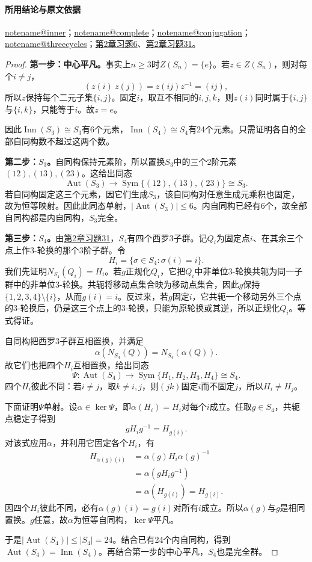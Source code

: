 \documentclass[UTF8,a4paper,11pt,fontset=windows]{ctexart}
\makeatletter
\DeclareMathOperator{\Aut}{Aut}\DeclareMathOperator{\Inn}{Inn}
\newcommand{\noteref}[1]{\hyperref[note:#1]{\csname notename@#1\endcsname}}
\newcommand{\exref}[2]{\hyperref[ex:#1:#2]{第#1章习题#2}}
\makeatother
\begin{document}
\paragraph{所用结论与原文依据}
\noteref{inner}；\noteref{complete}；\noteref{conjugation}；\noteref{threecycles}；\exref{2}{6}、\exref{2}{31}。


\begin{proof}
\textbf{第一步：中心平凡。}事实上$n\ge3$时$Z(S_n)=\{e\}$。若$z\in Z(S_n)$，则对每个$i\ne j$，
\[
(z(i)\ z(j))=z(ij)z^{-1}=(ij),
\]
所以$z$保持每个二元子集$\{i,j\}$。固定$i$，取互不相同的$i,j,k$，则$z(i)$同时属于$\{i,j\}$与$\{i,k\}$，只能等于$i$。故$z=e$。

因此$\operatorname{Inn}(S_3)\cong S_3$有6个元素，$\operatorname{Inn}(S_4)\cong S_4$有24个元素。只需证明各自的全部自同构数不超过这两个数。

\textbf{第二步：$S_3$。}自同构保持元素阶，所以置换$S_3$中的三个2阶元素$(12),(13),(23)$。这给出同态
\[
\Aut(S_3)\longrightarrow\operatorname{Sym}\{(12),(13),(23)\}\cong S_3.
\]
若自同构固定这三个元素，因它们生成$S_3$，该自同构对任意生成元乘积也固定，故为恒等映射。因此此同态单射，$|\Aut(S_3)|\le6$。内自同构已经有6个，故全部自同构都是内自同构，$S_3$完全。

\textbf{第三步：$S_4$。}由\exref{2}{31}，$S_4$有四个西罗3子群。记$Q_i$为固定点$i$、在其余三个点上作3-轮换的那个3阶子群。令
\[
H_i=\{\sigma\in S_4:\sigma(i)=i\}.
\]
我们先证明$N_{S_4}(Q_i)=H_i$。若$g$正规化$Q_i$，它把$Q_i$中非单位3-轮换共轭为同一子群中的非单位3-轮换。共轭将移动点集合映为移动点集合，因此$g$保持$\{1,2,3,4\}\setminus\{i\}$，从而$g(i)=i$。反过来，若$g$固定$i$，它共轭一个移动另外三个点的3-轮换后，仍是这三个点上的3-轮换，只能为原轮换或其逆，所以正规化$Q_i$。等式得证。

自同构把西罗3子群互相置换，并满足
\[
\alpha(N_{S_4}(Q))=N_{S_4}(\alpha(Q)).
\]
故它们也把四个$H_i$互相置换，给出同态
\[
\Psi:\Aut(S_4)\longrightarrow\operatorname{Sym}\{H_1,H_2,H_3,H_4\}\cong S_4.
\]
四个$H_i$彼此不同：若$i\ne j$，取$k\ne i,j$，则$(jk)$固定$i$而不固定$j$，所以$H_i\ne H_j$。

下面证明$\Psi$单射。设$\alpha\in\ker\Psi$，即$\alpha(H_i)=H_i$对每个$i$成立。任取$g\in S_4$，共轭点稳定子得到
\[
gH_ig^{-1}=H_{g(i)}.
\]
对该式应用$\alpha$，并利用它固定各个$H_i$，有
\begin{align*}
H_{\alpha(g)(i)}
&=\alpha(g)H_i\alpha(g)^{-1}\\
&=\alpha(gH_ig^{-1})\\
&=\alpha(H_{g(i)})=H_{g(i)}.
\end{align*}
因四个$H_i$彼此不同，必有$\alpha(g)(i)=g(i)$对所有$i$成立。所以$\alpha(g)$与$g$是相同置换。$g$任意，故$\alpha$为恒等自同构，$\ker\Psi$平凡。

于是$|\Aut(S_4)|\le|S_4|=24$。结合已有24个内自同构，得到$\Aut(S_4)=\operatorname{Inn}(S_4)$。再结合第一步的中心平凡，$S_4$也是完全群。
\end{proof}
\end{document}
